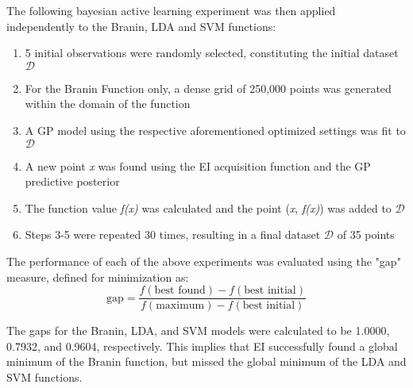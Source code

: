 \documentclass[11pt]{article}
\numberwithin{equation}{section}
\begin{document}
The following bayesian active learning experiment was then applied independently to the Branin, LDA and SVM functions:
\begin{enumerate}
  \item 5 initial observations were randomly selected, constituting the initial dataset $\mathcal{D}$
  \item For the Branin Function only, a dense grid of 250,000 points was generated within the domain of the function
  \item A GP model using the respective aforementioned optimized settings was fit to $\mathcal{D}$
  \item A new point \emph{x} was found using the EI acquisition function and the GP predictive posterior
  \item The function value \emph{f(x)} was calculated and the point (\emph{x}, \emph{f(x)}) was added to $\mathcal{D}$
  \item Steps 3-5 were repeated 30 times, resulting in a final dataset $\mathcal{D}$ of 35 points
\end{enumerate}

The performance of each of the above experiments was evaluated using the "gap" measure, defined for minimization as:
\begin{equation}
  \text{gap} = \dfrac{f(\text{best found}) - f(\text{best initial})}{f(\text{maximum}) - f(\text{best initial})}
  \label{eq:gap}
\end{equation}

The gaps for the Branin, LDA, and SVM models were calculated to be 1.0000, 0.7932, and 0.9604, respectively. 
This implies that EI successfully found a global minimum of the Branin function, but missed the global minimum of the LDA and SVM functions.
\end{document}
